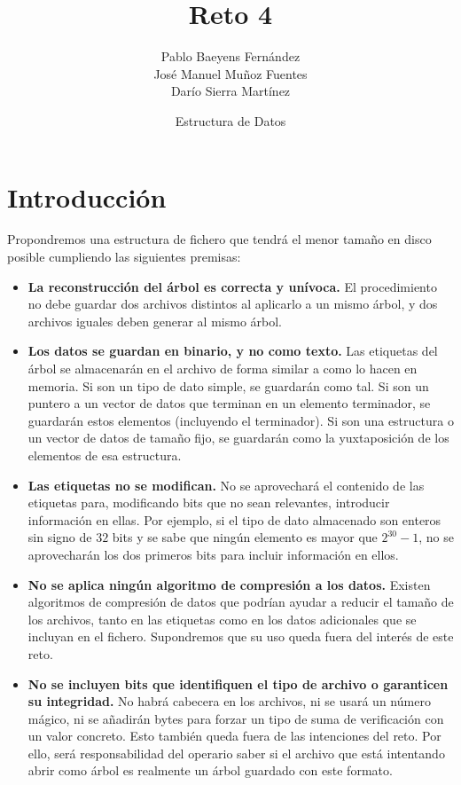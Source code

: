 \documentclass{article}
\title{Reto 4}
\date{Estructura de Datos}
\author{Pablo Baeyens Fernández\\José Manuel Muñoz Fuentes\\Darío Sierra Martínez}
\begin{document}
\maketitle

\section{Introducción}


Propondremos una estructura de fichero que tendrá el menor tamaño en disco
posible cumpliendo las siguientes premisas:
\begin{itemize}
	\item \textbf{La reconstrucción del árbol es correcta y unívoca.}
  El procedimiento no debe guardar dos archivos distintos al aplicarlo a un mismo
  árbol, y dos archivos iguales deben generar al mismo árbol.
	\item \textbf{Los datos se guardan en binario, y no como texto.} Las etiquetas
  del árbol se almacenarán en el archivo de forma similar a como lo hacen en
  memoria. Si son un tipo de dato simple, se guardarán como tal. Si son un puntero
  a un vector de datos que terminan en un elemento terminador, se guardarán
  estos elementos (incluyendo el terminador). Si son una estructura o un vector
  de datos de tamaño fijo, se guardarán como la yuxtaposición de los elementos
  de esa estructura.
	\item \textbf{Las etiquetas no se modifican.} No se aprovechará el contenido
  de las etiquetas para, modificando bits que no sean relevantes, introducir
  información en ellas. Por ejemplo, si el tipo de dato almacenado son enteros
  sin signo de $32$ bits y se sabe que ningún elemento es mayor que $2^{30}-1$,
  no se aprovecharán los dos primeros bits para incluir información en ellos.
	\item \textbf{No se aplica ningún algoritmo de compresión a los datos.}
  Existen algoritmos de compresión de datos que podrían ayudar a reducir el
  tamaño de los archivos, tanto en las etiquetas como en los datos adicionales
  que se incluyan en el fichero. Supondremos que su uso queda fuera del interés
  de este reto.
	\item \textbf{No se incluyen bits que identifiquen el tipo de archivo
  o garanticen su integridad.} No habrá cabecera en los archivos, ni se usará un
  número mágico, ni se añadirán bytes para forzar un tipo de suma de verificación
  con un valor concreto. Esto también queda fuera de las intenciones del reto.
  Por ello, será responsabilidad del operario saber si el archivo que está
  intentando abrir como árbol es realmente un árbol guardado con este formato.
\end{itemize}
\end{document}
